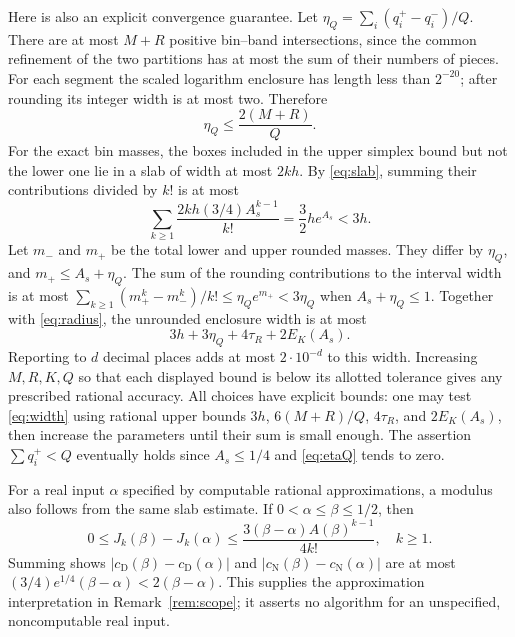 \documentclass[10pt]{article}
\theoremstyle{remark}
\newcommand{\cn}{c_{\mathrm N}}
\newcommand{\cd}{c_{\mathrm D}}
\begin{document}
Here is also an explicit convergence guarantee. Let
$\eta_Q=\sum_i(q_i^+-q_i^-)/Q$. There are at most $M+R$ positive
bin--band intersections, since the common refinement of the two
partitions has at most the sum of their numbers of pieces. For each
segment the scaled logarithm enclosure has length less than $2^{-20}$;
after rounding its integer width is at most two. Therefore
\begin{equation}\label{eq:etaQ}
 \eta_Q\leq\frac{2(M+R)}Q.
\end{equation}
For the exact bin masses, the boxes included in the upper simplex
bound but not the lower one lie in a slab of width at most $2kh$.
By \eqref{eq:slab}, summing their contributions divided by $k!$ is
at most
\[
 \sum_{k\geq1}\frac{2kh(3/4)A_s^{k-1}}{k!}
 =\frac32h e^{A_s}<3h.
\]
Let $m_-$ and $m_+$ be the total lower and upper rounded masses.
They differ by $\eta_Q$, and $m_+\leq A_s+\eta_Q$. The sum of
the rounding contributions to the interval width is at most
$\sum_{k\geq1}(m_+^k-m_-^k)/k!
\leq\eta_Q e^{m_+}<3\eta_Q$ when $A_s+\eta_Q\leq1$.
Together with \eqref{eq:radius}, the unrounded enclosure width is at most
\begin{equation}\label{eq:width}
 3h+3\eta_Q+4\tau_R+2E_K(A_s).
\end{equation}
Reporting to $d$ decimal places adds at most $2\cdot10^{-d}$ to
this width. Increasing $M,R,K,Q$ so that each displayed bound is below
its allotted tolerance gives any prescribed rational accuracy.
All choices have explicit bounds: one may test \eqref{eq:width}
using rational upper bounds $3h$, $6(M+R)/Q$, $4\tau_R$, and
$2E_K(A_s)$, then increase the parameters until their sum is small
enough. The assertion $\sum q_i^+<Q$ eventually holds since
$A_s\leq1/4$ and \eqref{eq:etaQ} tends to zero.

For a real input $\alpha$ specified by computable rational
approximations, a modulus also follows from the same slab estimate.
If $0<\alpha\leq\beta\leq1/2$, then
\[
 0\leq J_k(\beta)-J_k(\alpha)
 \leq\frac{3(\beta-\alpha)A(\beta)^{k-1}}{4k!},\quad k\geq1.
\]
Summing shows $|\cd(\beta)-\cd(\alpha)|$ and
$|\cn(\beta)-\cn(\alpha)|$ are at most
$(3/4)e^{1/4}(\beta-\alpha)<2(\beta-\alpha)$.
This supplies the approximation interpretation in
Remark~\ref{rem:scope}; it asserts no algorithm for an unspecified,
noncomputable real input.
\end{document}
